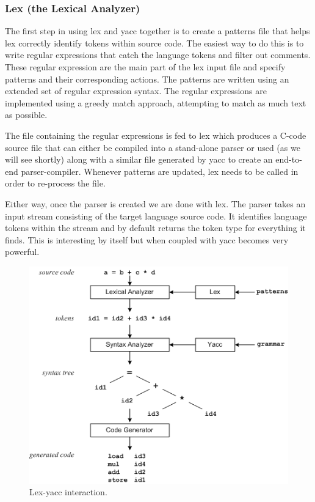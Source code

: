 \documentclass[journal]{IEEEtran}
\begin{document}
\subsubsection{Lex (the Lexical Analyzer)}
The first step in using lex and yacc together is to create a patterns file that helps lex
correctly identify tokens within source code.  The easiest way to do this is to write 
regular expressions that catch the language tokens and filter out comments.  These
regular expression are the main part of the lex input file and specify patterns
and their corresponding actions.  The patterns are written using an extended set 
of regular expression syntax.  The regular expressions are implemented using a 
greedy match approach, attempting to match as much text as possible.  

The file containing the regular expressions is fed to lex which produces a C-code source
file that can either be compiled into a stand-alone parser or used (as we will see shortly)
along with a similar file generated by yacc to create an end-to-end parser-compiler.  
Whenever patterns are updated, lex needs to be called in order to re-process the file.

Either way, once the parser is created we are done with lex.  The parser takes an input
stream consisting of the target language source code.  It identifies language tokens within
the stream and by default returns  the token type for everything it finds.  This is interesting
by itself but when coupled with yacc becomes very powerful.

\begin{center}
\begin{figure}[htb]
	\includegraphics[width=\columnwidth]{fig11.png}
	\caption{\label{fig:lex-yacc}Lex-yacc interaction.}
\end{figure}
\end{center}
\end{document}
